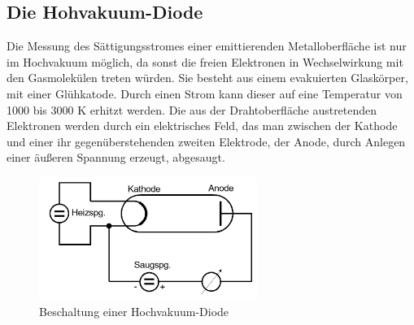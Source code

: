 \subsection{Die Hohvakuum-Diode}
Die Messung des Sättigungsstromes einer emittierenden Metalloberfläche ist nur im Hochvakuum möglich, da sonst die freien Elektronen in Wechselwirkung mit den Gasmolekülen treten würden.
Sie besteht aus einem evakuierten Glaskörper, mit einer Glühkatode.
Durch einen Strom kann dieser auf eine Temperatur von 1000 bis 3000 K erhitzt werden.
Die aus der Drahtoberfläche austretenden Elektronen werden durch ein elektrisches Feld, das man zwischen der Kathode und einer ihr gegenüberstehenden zweiten Elektrode, der Anode, durch Anlegen einer äußeren Spannung erzeugt, abgesaugt.
\begin{figure}
    \centering
    \includegraphics[height=4.0cm]{data/abb3.jpg}
    \caption{Beschaltung einer Hochvakuum-Diode \cite{V504}}
    \label{fig:abb3}
\end{figure} \\
\noindent

